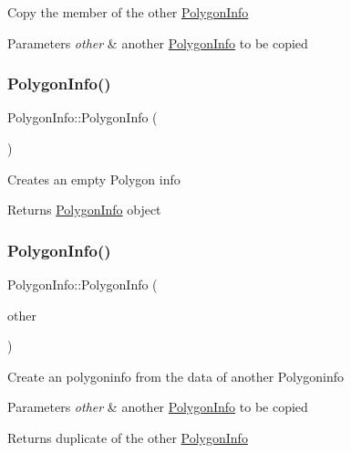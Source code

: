 Copy the member of the other \hyperlink{classPolygonInfo}{Polygon\+Info} 
\begin{DoxyParams}{Parameters}
{\em other} & another \hyperlink{classPolygonInfo}{Polygon\+Info} to be copied \\
\hline
\end{DoxyParams}
\mbox{\label{group____2d_ga069ceb08829c62f4d834b633b86ae420}} 
\subsubsection{\texorpdfstring{Polygon\+Info()}{PolygonInfo()}\hspace{0.1cm}{\footnotesize\ttfamily [1/2]}}
{\footnotesize\ttfamily Polygon\+Info\+::\+Polygon\+Info (\begin{DoxyParamCaption}{ }\end{DoxyParamCaption})}

Creates an empty Polygon info

\begin{DoxyReturn}{Returns}
\hyperlink{classPolygonInfo}{Polygon\+Info} object 
\end{DoxyReturn}
\mbox{\label{group____2d_gaf6fd909ca1d09d9b4acff7ca0be82683}} 
\subsubsection{\texorpdfstring{Polygon\+Info()}{PolygonInfo()}\hspace{0.1cm}{\footnotesize\ttfamily [2/2]}}
{\footnotesize\ttfamily Polygon\+Info\+::\+Polygon\+Info (\begin{DoxyParamCaption}\item[{const \hyperlink{classPolygonInfo}{Polygon\+Info} \&}]{other }\end{DoxyParamCaption})}

Create an polygoninfo from the data of another Polygoninfo 
\begin{DoxyParams}{Parameters}
{\em other} & another \hyperlink{classPolygonInfo}{Polygon\+Info} to be copied \\
\hline
\end{DoxyParams}
\begin{DoxyReturn}{Returns}
duplicate of the other \hyperlink{classPolygonInfo}{Polygon\+Info} 
\end{DoxyReturn}
\mbox{\label{group____2d_ga21c47c22ffc43bb0157be9b3be01f56b}} 
